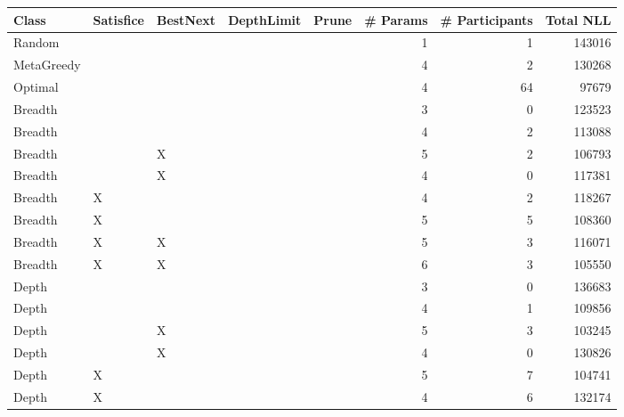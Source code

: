 \begin{tabular}{lllllrrr}
\toprule
      Class & Satisfice & BestNext & DepthLimit & Prune &  \# Params &  \# Participants &  Total NLL \\
\midrule
     Random &           &          &            &       &         1 &               1 &     143016 \\
 MetaGreedy &           &          &            &       &         4 &               2 &     130268 \\
    Optimal &           &          &            &       &         4 &              64 &      97679 \\
    Breadth &           &          &            &       &         3 &               0 &     123523 \\
    Breadth &           &          &            &       &         4 &               2 &     113088 \\
    Breadth &           &        X &            &       &         5 &               2 &     106793 \\
    Breadth &           &        X &            &       &         4 &               0 &     117381 \\
    Breadth &         X &          &            &       &         4 &               2 &     118267 \\
    Breadth &         X &          &            &       &         5 &               5 &     108360 \\
    Breadth &         X &        X &            &       &         5 &               3 &     116071 \\
    Breadth &         X &        X &            &       &         6 &               3 &     105550 \\
      Depth &           &          &            &       &         3 &               0 &     136683 \\
      Depth &           &          &            &       &         4 &               1 &     109856 \\
      Depth &           &        X &            &       &         5 &               3 &     103245 \\
      Depth &           &        X &            &       &         4 &               0 &     130826 \\
      Depth &         X &          &            &       &         5 &               7 &     104741 \\
      Depth &         X &          &            &       &         4 &               6 &     132174 \\

\end{tabular}
